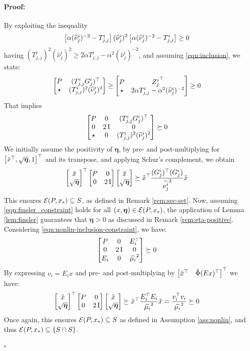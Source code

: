 \documentclass{ifacconf}
\theoremstyle{plain}
\newenvironment{proof}{\paragraph*{Proof:}}{\hfill$\square$}
\begin{document}
\begin{proof}
By exploiting the inequality $$\left[\begin{matrix}\alpha (\widehat{\nu}^i_j)^{-2} - T^i_{j, j}\end{matrix}\right](\widehat{\nu}^i_j)^2\left[\begin{matrix}\alpha (\widehat{\nu}^i_j)^{-2} - T^i_{j, j}\end{matrix}\right] \geq 0$$ having $(T^i_{j,j})^2(\widehat{\nu}^i_j)^2 \geq 2 \alpha T^i_{j,j} - \alpha^2 (\widehat{\nu}_j^i)^{-2}$, and assuming \eqref{eqn:inclusion}, we state:
$$
\left[\begin{matrix}
P & (T^i_{j,j} G^i_j)^\top\\
\star & (T^i_{j,j})^2(\widehat{\nu}^i_j)^2
\end{matrix}\right] \geq 
\left[\begin{matrix}
P & {Z_j^i}^\top\\
\star & 2 \alpha T^i_{j,j} - \alpha^2 (\widehat{\nu}_j^i)^{-2}
\end{matrix}\right] \geq 0
$$
That implies
$$
\left[\begin{matrix}
P & 0 & (T^i_{j,j} G^i_j)^\top\\
0 & 2 \operatorname{I} & 0\\
\star & 0 &(T^i_{j,j})^2(\widehat{\nu}^i_j)^2
\end{matrix}\right] \succeq 0
$$
We initially assume the positivity of $\boldsymbol{\eta}$, by pre- and post-multiplying for $\left[\begin{matrix}\tilde{x}^\top, \sqrt{\boldsymbol{\eta}}, 1\end{matrix}\right]^\top$ and its transpose, and applying Schur's complement, we obtain
$$
\left[\begin{matrix}\tilde{x}\\ \sqrt{\boldsymbol{\eta}}\end{matrix}\right]^\top \left[\begin{matrix}P & 0\\ 0 & 2 \operatorname{I}\end{matrix}\right] \left[\begin{matrix}\tilde{x}\\ \sqrt{\boldsymbol{\eta}}\end{matrix}\right] \succeq \tilde{x}^\top \frac{(G^i_j)^\top (G^i_j)}{\widehat{\nu^i_j}^2} \tilde{x}
$$
This ensures ${\mathcal{E}}(P, x_*) \subseteq S$, as defined in Remark \ref{rem:sec-set}. Now, assuming \eqref{eqn:finsler_constraint} holds for all $(x, \boldsymbol{\eta}) \in {\mathcal{E}}(P, x_*)$, the application of Lemma \ref{lem:finsler} guarantees that $\boldsymbol{\eta} > 0$ as discussed in Remark \ref{rem:eta-positive}. Considering \eqref{eqn:nonlin-inclusion-constraint}, we have:
$$
\left[\begin{matrix}P & 0 & E_i^\top \\
0 & 2 \operatorname{I} & 0 \\
E_i & 0 & \widehat{\mu_i}^2\end{matrix}\right] \succeq 0
$$
By expressing $v_i = E_i x$ and pre- and post-multiplying by $\left[\begin{matrix}\tilde{x}^\top & \tilde{\Phi}(Ex)^\top\end{matrix}\right]^\top$ we have:
$$
\left[\begin{matrix}\tilde{x}\\ \sqrt{\boldsymbol{\eta}}\end{matrix}\right]^\top \left[\begin{matrix}P & 0\\ 0 & 2 \operatorname{I}\end{matrix}\right] \left[\begin{matrix}\tilde{x}\\ \sqrt{\boldsymbol{\eta}}\end{matrix}\right] \succeq \tilde{x}^\top \frac{E_i^\top E_i}{\widehat{\mu_i}^2} \tilde{x} = \frac{v_i^\top v_i}{\widehat{\mu_i}^2} \succeq 0
$$
Once again, this ensures ${\mathcal{E}}(P, x_*) \subseteq \relax{S}$ as defined in Assumption \ref{ass:nonlin}, and thus ${\mathcal{E}}(P, x_*) \subseteq \left\{ S \cap \relax{S} \right\}$.


\end{proof}
\end{document}
